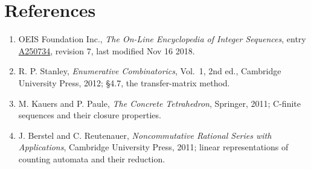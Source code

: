 \documentclass[11pt]{article}
\theoremstyle{definition}
\begin{document}
\section{References}

\begin{enumerate}

\item OEIS Foundation Inc., \emph{The On-Line Encyclopedia of Integer Sequences}, entry \href{https://oeis.org/A250734}{A250734}, revision 7, last modified Nov 16 2018.

\item R. P. Stanley, \emph{Enumerative Combinatorics}, Vol.~1, 2nd ed., Cambridge University Press, 2012; \S4.7, the transfer-matrix method.

\item M. Kauers and P. Paule, \emph{The Concrete Tetrahedron}, Springer, 2011; C-finite sequences and their closure properties.

\item J. Berstel and C. Reutenauer, \emph{Noncommutative Rational Series with Applications}, Cambridge University Press, 2011; linear representations of counting automata and their reduction.

\end{enumerate}
\end{document}
